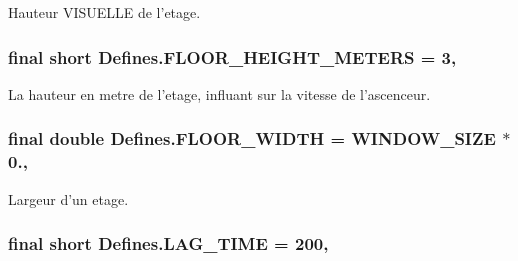 Hauteur V\-I\-S\-U\-E\-L\-L\-E de l'etage. 

\hypertarget{classDefines_aae6f35fc0dc85e4189f0be67c6af6fb1}{
\subsubsection[{F\-L\-O\-O\-R\-\_\-\-H\-E\-I\-G\-H\-T\-\_\-\-M\-E\-T\-E\-R\-S}]{\setlength{\rightskip}{0pt plus 5cm}final short Defines.\-F\-L\-O\-O\-R\-\_\-\-H\-E\-I\-G\-H\-T\-\_\-\-M\-E\-T\-E\-R\-S = 3\hspace{0.3cm}{\ttfamily [static]}, {\ttfamily [package]}}}\label{classDefines_aae6f35fc0dc85e4189f0be67c6af6fb1}


La hauteur en metre de l'etage, influant sur la vitesse de l'ascenceur. 

\hypertarget{classDefines_ad5528ce6b91911a4ca4e9f364543ef9c}{
\subsubsection[{F\-L\-O\-O\-R\-\_\-\-W\-I\-D\-T\-H}]{\setlength{\rightskip}{0pt plus 5cm}final double Defines.\-F\-L\-O\-O\-R\-\_\-\-W\-I\-D\-T\-H = {\bf W\-I\-N\-D\-O\-W\-\_\-\-S\-I\-Z\-E} $\ast$ 0.\hspace{0.3cm}{\ttfamily [static]}, {\ttfamily [package]}}}\label{classDefines_ad5528ce6b91911a4ca4e9f364543ef9c}


Largeur d'un etage. 

\hypertarget{classDefines_a496860d61bb30a925275bfde3ddc3b20}{
\subsubsection[{L\-A\-G\-\_\-\-T\-I\-M\-E}]{\setlength{\rightskip}{0pt plus 5cm}final short Defines.\-L\-A\-G\-\_\-\-T\-I\-M\-E = 200\hspace{0.3cm}{\ttfamily [static]}, {\ttfamily [package]}}}\label{classDefines_a496860d61bb30a925275bfde3ddc3b20}


